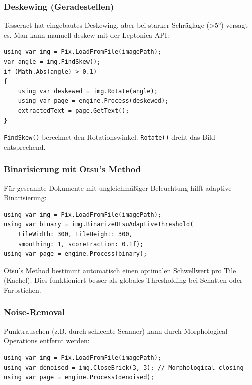 \subsubsection{Deskewing (Geradestellen)}
Tesseract hat eingebautes Deskewing, aber bei starker Schräglage (>5°) versagt es. Man kann manuell deskew mit der Leptonica-API:

\begin{lstlisting}[language={[Sharp]C}, caption={Deskewing-Beispiel (nicht implementiert)}, label={lst:deskewing}]
using var img = Pix.LoadFromFile(imagePath);
var angle = img.FindSkew();
if (Math.Abs(angle) > 0.1)
{
    using var deskewed = img.Rotate(angle);
    using var page = engine.Process(deskewed);
    extractedText = page.GetText();
}
\end{lstlisting}

\texttt{FindSkew()} berechnet den Rotationswinkel. \texttt{Rotate()} dreht das Bild entsprechend.

\subsubsection{Binarisierung mit Otsu's Method}
Für gescannte Dokumente mit ungleichmäßiger Beleuchtung hilft adaptive Binarisierung:

\begin{lstlisting}[language={[Sharp]C}, caption={Adaptive Binarisierung (Konzept)}, label={lst:binarization}]
using var img = Pix.LoadFromFile(imagePath);
using var binary = img.BinarizeOtsuAdaptiveThreshold(
    tileWidth: 300, tileHeight: 300, 
    smoothing: 1, scoreFraction: 0.1f);
using var page = engine.Process(binary);
\end{lstlisting}

Otsu's Method bestimmt automatisch einen optimalen Schwellwert pro Tile (Kachel). Dies funktioniert besser als globales Thresholding bei Schatten oder Farbstichen.

\subsubsection{Noise-Removal}
Punktrauschen (z.B. durch schlechte Scanner) kann durch Morphological Operations entfernt werden:

\begin{lstlisting}[language={[Sharp]C}, caption={Noise-Removal (Konzept)}, label={lst:noise_removal}]
using var img = Pix.LoadFromFile(imagePath);
using var denoised = img.CloseBrick(3, 3); // Morphological closing
using var page = engine.Process(denoised);
\end{lstlisting}

